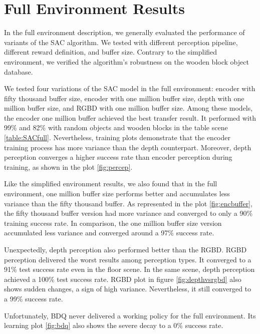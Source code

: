 \section{Full Environment Results}


In the full environment description, we generally evaluated the performance of variants of the SAC algorithm. We tested with different perception pipeline, different reward definition, and buffer size. Contrary to the simplified environment, we verified the algorithm's robustness on the wooden block object database.

We tested four variations of the SAC model in the full environment: encoder with fifty thousand buffer size, encoder with one million buffer size, depth with one million buffer size, and RGBD with one million buffer size. Among these models, the encoder one million buffer achieved the best transfer result. It performed with 99\% and 82\% with random objects and wooden blocks in the table scene \ref{table:SACfull}. Nevertheless, training plots demonstrate that the encoder training process has more variance than the depth counterpart. Moreover, depth perception converges a higher success rate than encoder perception during training, as shown in the plot \ref{fig:percep}.

Like the simplified environment results, we also found that in the full environment, one million buffer size performs better and accumulates less variance than the fifty thousand buffer. As represented in the plot \ref{fig:encbuffer}, the fifty thousand buffer version had more variance and converged to only a 90\% training success rate. In comparison, the one million buffer size version accumulated less variance and converged around a 97\% success rate.  

Unexpectedly, depth perception also performed better than the RGBD. RGBD perception delivered the worst results among perception types. It converged to a 91\% test success rate even in the floor scene. In the same scene, depth perception achieved a 100\% test success rate. RGBD plot in figure \ref{fig:depthvsrgbd} also shows sudden changes, a sign of high variance. Nevertheless, it still converged to a 99\% success rate.

Unfortunately, BDQ never delivered a working policy for the full environment. Its learning plot \ref{fig:bdq} also shows the severe decay to a 0\% success rate.

